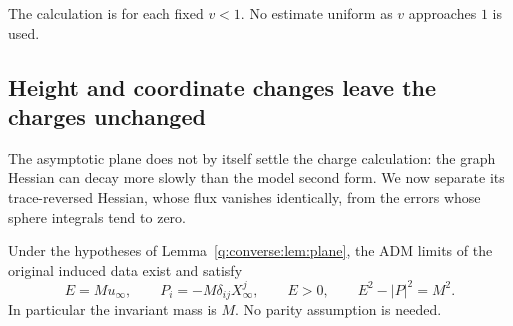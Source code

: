 The calculation is for each fixed $v<1$.  No estimate uniform as
$v$ approaches $1$ is used.

\subsection{Height and coordinate changes leave the charges unchanged}

The asymptotic plane does not by itself settle the charge calculation:
the graph Hessian can decay more slowly than the model second form.
We now separate its trace-reversed Hessian, whose flux vanishes
identically, from the errors whose sphere integrals tend to zero.


\begin{proposition}
\label{q:converse:prop:adm}
Under the hypotheses of Lemma~\ref{q:converse:lem:plane}, the ADM limits
of the original induced data exist and satisfy
\begin{equation}
 E=M u_\infty,\qquad P_i=-M\delta_{ij}X_\infty^j,
 \qquad E>0,\qquad E^2-|P|^2=M^2.
 \label{q:converse:eq:charges}
\end{equation}
In particular the invariant mass is $M$.  No parity assumption is
needed.
\end{proposition}

